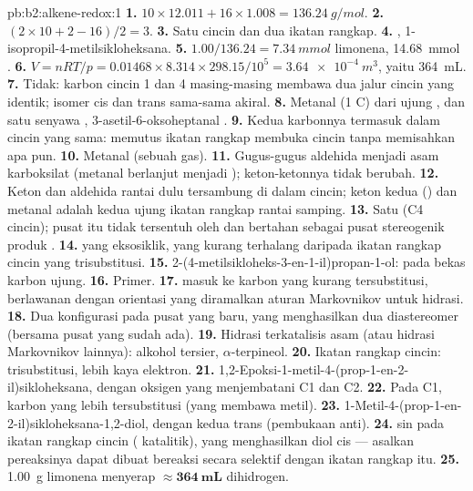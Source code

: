 \begin{solution}{pb:b2:alkene-redox:1}
\textbf{1.} $10 \times 12.011 + 16 \times 1.008 = \qty{136.24}{g/mol}$.
\textbf{2.} $(2 \times 10 + 2 - 16)/2 = 3$.
\textbf{3.} Satu cincin dan dua ikatan rangkap.
\textbf{4.} , 1-isopropil-4-metilsikloheksana.
\textbf{5.} $1.00/136.24 = \qty{7.34}{mmol}$ limonena, \qty{14.68}{mmol} .
\textbf{6.} $V = nRT/p = 0.01468 \times 8.314 \times 298.15/10^5 = \qty{3.64e-4}{m^3}$,
yaitu \qty{364}{mL}.
\textbf{7.} Tidak: karbon cincin 1 dan 4 masing-masing membawa dua jalur
cincin yang identik; isomer cis dan trans sama-sama akiral.
\textbf{8.} Metanal  (1 C) dari ujung , dan satu senyawa
, 3-asetil-6-oksoheptanal .
\textbf{9.} Kedua karbonnya termasuk dalam cincin yang sama: memutus ikatan
rangkap membuka cincin tanpa memisahkan apa pun.
\textbf{10.} Metanal (sebuah gas).
\textbf{11.} Gugus-gugus aldehida menjadi asam karboksilat (metanal berlanjut
menjadi ); keton-ketonnya tidak berubah.
\textbf{12.} Keton dan aldehida rantai  dulu tersambung di dalam
cincin; keton kedua () dan metanal adalah kedua ujung ikatan
rangkap rantai samping.
\textbf{13.} Satu (C4 cincin); pusat itu tidak tersentuh oleh  dan
bertahan sebagai pusat stereogenik produk .
\textbf{14.}  yang eksosiklik, yang kurang terhalang daripada ikatan
rangkap cincin yang trisubstitusi.
\textbf{15.} 2-(4-metilsikloheks-3-en-1-il)propan-1-ol:  pada bekas
karbon ujung.
\textbf{16.} Primer.
\textbf{17.}  masuk ke karbon yang kurang tersubstitusi, berlawanan
dengan orientasi yang diramalkan aturan Markovnikov untuk hidrasi.
\textbf{18.} Dua konfigurasi pada pusat yang baru, yang menghasilkan dua
diastereomer (bersama pusat yang sudah ada).
\textbf{19.} Hidrasi terkatalisis asam (atau hidrasi Markovnikov lainnya):
alkohol tersier, $\alpha$-terpineol.
\textbf{20.} Ikatan rangkap cincin: trisubstitusi, lebih kaya elektron.
\textbf{21.} 1,2-Epoksi-1-metil-4-(prop-1-en-2-il)sikloheksana, dengan
oksigen yang menjembatani C1 dan C2.
\textbf{22.} Pada C1, karbon yang lebih tersubstitusi (yang membawa metil).
\textbf{23.} 1-Metil-4-(prop-1-en-2-il)sikloheksana-1,2-diol, dengan kedua
 trans (pembukaan anti).
\textbf{24.}  sin pada ikatan rangkap cincin (
katalitik), yang menghasilkan diol cis --- asalkan pereaksinya dapat dibuat
bereaksi secara selektif dengan ikatan rangkap itu.
\textbf{25.} \qty{1.00}{g} limonena menyerap $\boldsymbol{\approx \qty{364}{mL}}$
dihidrogen.
\end{solution}
